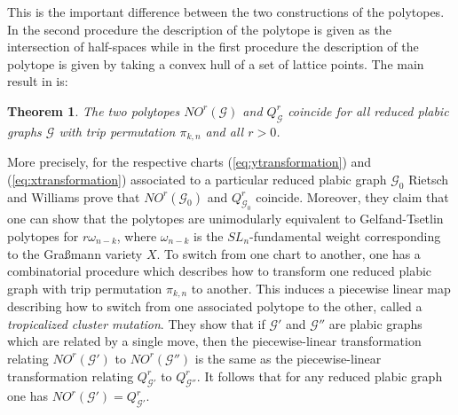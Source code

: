 \documentclass{emsprocart}
\newtheorem{theorem}{Theorem}[section]
\theoremstyle{definition}
\begin{document}
This is the important difference between the two constructions of the polytopes.
In the second procedure the 
description of the polytope is given as the intersection of half-spaces while in the first procedure the description of the polytope is given by taking a convex hull of a set of lattice points.
The main result in \cite{RW} is:
\begin{theorem}
The two polytopes $NO^r(\mathcal G)$ and $Q_{\mathcal G}^r$ coincide  
for all reduced plabic graphs $\mathcal G$ with trip permutation $\pi_{k,n}$ and all $r>0$. 
\end{theorem}
More precisely, for the respective charts (\ref{eq:ytransformation}) and (\ref{eq:xtransformation}) associated to a particular reduced plabic graph $\mathcal G_0$ Rietsch and Williams prove that $NO^r(\mathcal G_0)$ and $Q_{\mathcal G_0}^r$
coincide. Moreover, they claim that one can show that the polytopes are unimodularly equivalent to 
Gelfand-Tsetlin polytopes for $r\omega_{n-k}$,  where $\omega_{n-k}$ is the $SL_n$-fundamental weight corresponding to the Gra\ss mann variety $X$. 
To switch from one chart to another, one has a combinatorial procedure which describes how to transform one reduced plabic graph with trip permutation $\pi_{k,n}$ to another. This induces a piecewise linear map describing how to switch from one associated polytope to the 
other, called a {\it tropicalized cluster mutation}. They show that if $\mathcal G'$ and $\mathcal G''$ are plabic graphs
which are related by a single move, then the piecewise-linear transformation relating 
$NO^r(\mathcal G')$ to $NO^r(\mathcal G'')$ is the
same as the piecewise-linear transformation relating $Q_{\mathcal G'}^r$ to $Q_{\mathcal G''}^r$. 
It follows that for any reduced plabic graph one has $NO^r(\mathcal G')=Q_{\mathcal G'}^r$.
\end{document}

